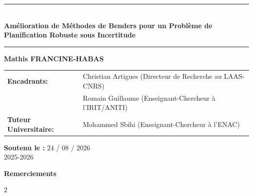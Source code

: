 \documentclass[12pt, a4paper, twoside]{article}
\numberwithin{equation}{section}
\begin{document}
\begin{titlepage}
		\vspace{2.5cm}
		
		\begin{center}
			{\color{mainblue}\rule{\textwidth}{2pt}} \\[0.6cm]
			{\sffamily \Huge \bfseries Amélioration de Méthodes de Benders pour un Problème de Planification Robuste sous Incertitude} \\[0.4cm] 
			{\color{mainblue}\rule{\textwidth}{2pt}}
		\end{center}
		
		\vspace{1.5cm}
		
		\begin{center}
			{\Large \textbf{Mathis FRANCINE-HABAS}} \\[1cm]
			
			\begin{tabular}{ll}
				\textbf{Encadrants:} & Christian Artigues \hfill (Directeur de Recherche au LAAS-CNRS) \\
				& Romain Guillaume \hfill (Enseignant-Chercheur à l'IRIT/ANITI) \\[0.3cm]
				\textbf{Tuteur Universitaire:} & Mohammed Sbihi \hfill (Enseignant-Chercheur à l’ENAC)
			\end{tabular}
		\end{center}
		
		\vfill
		
		\begin{center}
			{\large \textbf{Soutenu le :} 24 / 08 / 2026} \\
			\vspace{0.2cm}
			{\large 2025-2026}
		\end{center}
	\end{titlepage}
	
	\clearpage
	\thispagestyle{empty}
	
	\vspace*{\fill}
	
	\begin{center}
		{\sffamily \Huge \bfseries \textcolor{mainblue}{Remerciements}} \\[1.5cm]
	\end{center}
	
	\begin{spacing}{2}
		
		
	\end{spacing}
\end{document}
